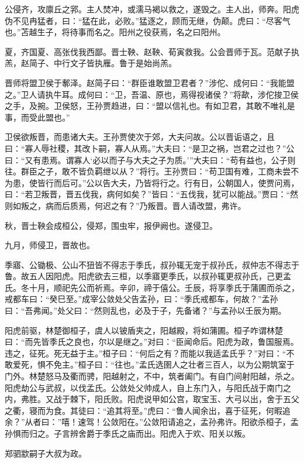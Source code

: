 \documentclass[]{article}
\begin{document}
公侵齐，攻廪丘之郛。主人焚冲，或濡马褐以救之，遂毁之。主人出，师奔。阳虎伪不见冉猛者，曰：``猛在此，必败。''猛逐之，顾而无继，伪颠。虎曰：``尽客气也。''苫越生子，将待事而名之。阳州之役获焉，名之曰阳州。

夏，齐国夏、高张伐我西鄙。晋士鞅、赵鞅、荀寅救我。公会晋师于瓦。范献子执羔，赵简子、中行文子皆执雁。鲁于是始尚羔。

晋师将盟卫侯于鄟泽。赵简子曰：``群臣谁敢盟卫君者？''涉佗、成何曰：``我能盟之。''卫人请执牛耳。成何曰：``卫，吾温、原也，焉得视诸侯？''将歃，涉佗捘卫侯之手，及捥。卫侯怒，王孙贾趋进，曰：``盟以信礼也。有如卫君，其敢不唯礼是事，而受此盟也。''

卫侯欲叛晋，而患诸大夫。王孙贾使次于郊，大夫问故。公以晋诟语之，且曰：``寡人辱社稷，其改卜嗣，寡人从焉。''大夫曰：``是卫之祸，岂君之过也？''公曰：``又有患焉。谓寡人`必以而子与大夫之子为质。'''大夫曰：``苟有益也，公子则往。群臣之子，敢不皆负羁绁以从？''将行。王孙贾曰：``苟卫国有难，工商未尝不为患，使皆行而后可。''公以告大夫，乃皆将行之。行有日，公朝国人，使贾问焉，曰：``若卫叛晋，晋五伐我，病何如矣？''皆曰：``五伐我，犹可以能战。''贾曰：``然则如叛之，病而后质焉，何迟之有？''乃叛晋。晋人请改盟，弗许。

秋，晋士鞅会成桓公，侵郑，围虫牢，报伊阙也。遂侵卫。

九月，师侵卫，晋故也。

季寤、公锄极、公山不狃皆不得志于季氏，叔孙辄无宠于叔孙氏，叔仲志不得志于鲁。故五人因阳虎。阳虎欲去三桓，以季寤更季氏，以叔孙辄更叔孙氏，己更孟氏。冬十月，顺祀先公而祈焉。辛卯，禘于僖公。壬辰，将享季氏于蒲圃而杀之，戒都车曰：``癸巳至。''成宰公敛处父告孟孙，曰：``季氏戒都车，何故？''孟孙曰：``吾弗闻。''处父曰：``然则乱也，必及于子，先备诸？''与孟孙以壬辰为期。

阳虎前驱，林楚御桓子，虞人以铍盾夹之，阳越殿，将如蒲圃。桓子咋谓林楚曰：``而先皆季氏之良也，尔以是继之。''对曰：``臣闻命后。阳虎为政，鲁国服焉。违之，征死。死无益于主。''桓子曰：``何后之有？而能以我适孟氏乎？''对曰：``不敢爱死，惧不免主。''桓子曰：``往也。''孟氏选圉人之壮者三百人，以为公期筑室于门外。林楚怒马及衢而骋，阳越射之，不中，筑者阖门。有自门间射阳越，杀之。阳虎劫公与武叔，以伐孟氏。公敛处父帅成人，自上东门入，与阳氏战于南门之内，弗胜。又战于棘下，阳氏败。阳虎说甲如公宫，取宝玉、大弓以出，舍于五父之衢，寝而为食。其徒曰：``追其将至。''虎曰：``鲁人闻余出，喜于征死，何暇追余？''从者曰：''嘻！速驾！公敛阳在。''公敛阳请追之，孟孙弗许。阳欲杀桓子，孟孙惧而归之。子言辨舍爵于季氏之庙而出。阳虎入于欢、阳关以叛。

郑驷歂嗣子大叔为政。
\end{document}
